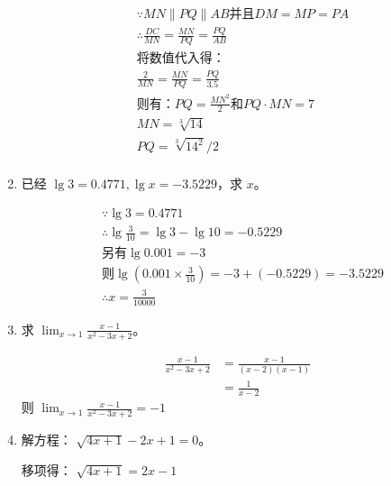 \documentclass[answers]{exam}
\begin{document}
\begin{questions}
\begin{enumerate}[label=(\arabic*)]
		      \begin{solution}
			      \begin{align*}
				       & \because MN \parallel PQ \parallel AB \text{并且} DM = MP = PA \\
				       & \therefore \frac{DC}{MN} = \frac{MN}{PQ} = \frac{PQ}{AB}       \\
				       & \text{将数值代入得：}                                          \\
				       & \frac{2}{MN} = \frac{MN}{PQ} = \frac{PQ}{3.5}                  \\
				       & \text{则有：} PQ = \frac{MN^2}{2} \text{和} PQ \cdot MN = 7    \\
				       & MN = \sqrt[3]{14}                                              \\
				       & PQ = \sqrt[3]{14^2} / 2                                        \\
			      \end{align*}
		      \end{solution}
		\item 已经 \( \lg3=0.4771, \lg{x}=-3.5229 \)，求 \( x \)。
		      \begin{solution}
			      \begin{align*}
				       & \because \lg3                              = 0.4771                   \\
				       & \therefore \lg{\frac{3}{10}}               = \lg3 - \lg10 = -0.5229   \\
				       & \text{另有} \lg0.001                       = -3                       \\
				       & \text{则} \lg(0.001 \times \frac{3}{10} )  = -3 + (-0.5229) = -3.5229 \\
				       & \therefore x = \frac{3}{10000}
			      \end{align*}
		      \end{solution}
		\item 求 \(\displaystyle \lim_{x\to1}\frac{x-1}{x^2-3x+2} \)。
		      \begin{solution}
			      \begin{align*}
				      \frac{x-1}{x^2 - 3x + 2} & = \frac{x-1}{(x-2)(x-1)} \\
				                               & = \frac{1}{x-2}
			      \end{align*}
			      则 \( \displaystyle \lim_{x\to1}\frac{x-1}{x^2-3x+2}=-1 \)
		      \end{solution}
		\item 解方程： \( \sqrt{4x+1} - 2x + 1 = 0 \)。
		      \begin{solution}
			      移项得：
			      \begin{math}
				      \sqrt{4x+1} = 2x - 1
			      \end{math}


\end{solution}
\end{enumerate}
\end{questions}
\end{document}
